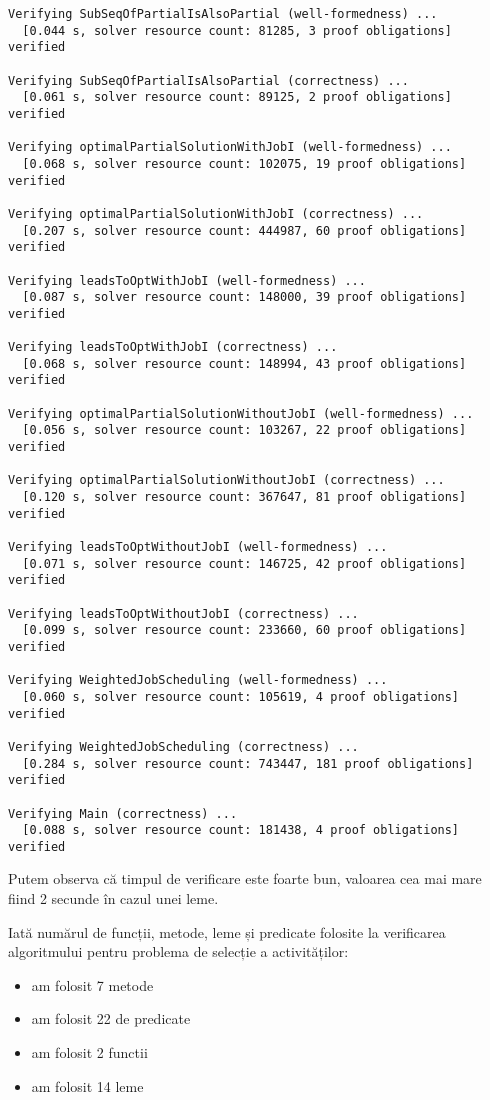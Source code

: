 \begin{Verbatim}[fontsize=\small]
Verifying SubSeqOfPartialIsAlsoPartial (well-formedness) ...
  [0.044 s, solver resource count: 81285, 3 proof obligations]  verified

Verifying SubSeqOfPartialIsAlsoPartial (correctness) ...
  [0.061 s, solver resource count: 89125, 2 proof obligations]  verified

Verifying optimalPartialSolutionWithJobI (well-formedness) ...
  [0.068 s, solver resource count: 102075, 19 proof obligations]  verified

Verifying optimalPartialSolutionWithJobI (correctness) ...
  [0.207 s, solver resource count: 444987, 60 proof obligations]  verified

Verifying leadsToOptWithJobI (well-formedness) ...
  [0.087 s, solver resource count: 148000, 39 proof obligations]  verified

Verifying leadsToOptWithJobI (correctness) ...
  [0.068 s, solver resource count: 148994, 43 proof obligations]  verified

Verifying optimalPartialSolutionWithoutJobI (well-formedness) ...
  [0.056 s, solver resource count: 103267, 22 proof obligations]  verified

Verifying optimalPartialSolutionWithoutJobI (correctness) ...
  [0.120 s, solver resource count: 367647, 81 proof obligations]  verified

Verifying leadsToOptWithoutJobI (well-formedness) ...
  [0.071 s, solver resource count: 146725, 42 proof obligations]  verified

Verifying leadsToOptWithoutJobI (correctness) ...
  [0.099 s, solver resource count: 233660, 60 proof obligations]  verified

Verifying WeightedJobScheduling (well-formedness) ...
  [0.060 s, solver resource count: 105619, 4 proof obligations]  verified

Verifying WeightedJobScheduling (correctness) ...
  [0.284 s, solver resource count: 743447, 181 proof obligations]  verified

Verifying Main (correctness) ...
  [0.088 s, solver resource count: 181438, 4 proof obligations]  verified
\end{Verbatim}

Putem observa că timpul de verificare este foarte bun, valoarea cea mai mare  fiind 2 secunde în cazul unei leme. 

Iată numărul de funcții, metode, leme și predicate folosite la verificarea algoritmului pentru problema de selecție a activităților:
\begin{itemize}
    \item am folosit 7 metode
    \item am folosit 22 de predicate
    \item am folosit 2 functii
    \item am folosit 14 leme
\end{itemize}

